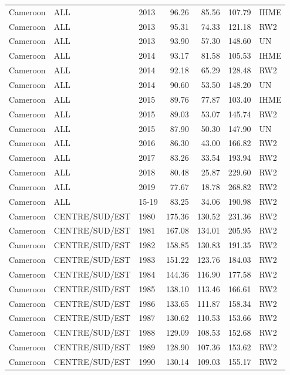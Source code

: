 \begin{longtable}{lllrrrl}
  Cameroon & ALL & 2013 & 96.26 & 85.56 & 107.79 & IHME \\ 
  Cameroon & ALL & 2013 & 95.31 & 74.33 & 121.18 & RW2 \\ 
  Cameroon & ALL & 2013 & 93.90 & 57.30 & 148.60 & UN \\ 
  Cameroon & ALL & 2014 & 93.17 & 81.58 & 105.53 & IHME \\ 
  Cameroon & ALL & 2014 & 92.18 & 65.29 & 128.48 & RW2 \\ 
  Cameroon & ALL & 2014 & 90.60 & 53.50 & 148.20 & UN \\ 
  Cameroon & ALL & 2015 & 89.76 & 77.87 & 103.40 & IHME \\ 
  Cameroon & ALL & 2015 & 89.03 & 53.07 & 145.74 & RW2 \\ 
  Cameroon & ALL & 2015 & 87.90 & 50.30 & 147.90 & UN \\ 
  Cameroon & ALL & 2016 & 86.30 & 43.00 & 166.82 & RW2 \\ 
  Cameroon & ALL & 2017 & 83.26 & 33.54 & 193.94 & RW2 \\ 
  Cameroon & ALL & 2018 & 80.48 & 25.87 & 229.60 & RW2 \\ 
  Cameroon & ALL & 2019 & 77.67 & 18.78 & 268.82 & RW2 \\ 
  Cameroon & ALL & 15-19 & 83.25 & 34.06 & 190.98 & RW2 \\ 
  Cameroon & CENTRE/SUD/EST & 1980 & 175.36 & 130.52 & 231.36 & RW2 \\ 
  Cameroon & CENTRE/SUD/EST & 1981 & 167.08 & 134.01 & 205.95 & RW2 \\ 
  Cameroon & CENTRE/SUD/EST & 1982 & 158.85 & 130.83 & 191.35 & RW2 \\ 
  Cameroon & CENTRE/SUD/EST & 1983 & 151.22 & 123.76 & 184.03 & RW2 \\ 
  Cameroon & CENTRE/SUD/EST & 1984 & 144.36 & 116.90 & 177.58 & RW2 \\ 
  Cameroon & CENTRE/SUD/EST & 1985 & 138.10 & 113.46 & 166.61 & RW2 \\ 
  Cameroon & CENTRE/SUD/EST & 1986 & 133.65 & 111.87 & 158.34 & RW2 \\ 
  Cameroon & CENTRE/SUD/EST & 1987 & 130.62 & 110.53 & 153.66 & RW2 \\ 
  Cameroon & CENTRE/SUD/EST & 1988 & 129.09 & 108.53 & 152.68 & RW2 \\ 
  Cameroon & CENTRE/SUD/EST & 1989 & 128.90 & 107.36 & 153.62 & RW2 \\ 
  Cameroon & CENTRE/SUD/EST & 1990 & 130.14 & 109.03 & 155.17 & RW2 \\ 

\end{longtable}
